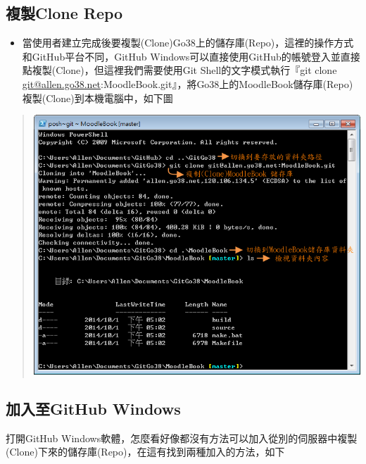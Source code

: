 \documentclass[letterpaper,10pt,english]{sphinxmanual}
\begin{document}
\subsection{複製Clone Repo}
\label{_doc/writing/index-github:id9}\begin{itemize}
\item {} 
當使用者建立完成後要複製(Clone)Go38上的儲存庫(Repo)，這裡的操作方式和GitHub平台不同，GitHub Windows可以直接使用GitHub的帳號登入並直接點複製(Clone)，但這裡我們需要使用Git Shell的文字模式執行『git clone \href{mailto:git@allen.go38.net}{git@allen.go38.net}:MoodleBook.git』，將Go38上的MoodleBook儲存庫(Repo)複製(Clone)到本機電腦中，如下圖

\end{itemize}
\begin{quote}

\includegraphics{GitHub-Shell-001.png}
\end{quote}


\subsection{加入至GitHub Windows}
\label{_doc/writing/index-github:id10}
打開GitHub Windows軟體，怎麼看好像都沒有方法可以加入從別的伺服器中複製(Clone)下來的儲存庫(Repo)，在這有找到兩種加入的方法，如下
\end{document}
